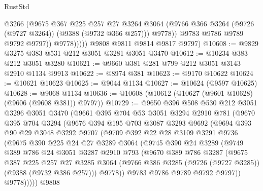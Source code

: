 \begin{lexlean}{RustStd}
\begin{coremodule}
                      @3266
                      (@9675
                        @367
                        @225
                        @257
                        @27
                        @3264
                        @3064
                        (@9766 @366 @3264 (@9726 (@9727 @3264)) (@9388 (@9732 @366 @257)))
                        @9778))
                    @9783
                    @9786
                    @9789
                    @9792
                    @9797))
                @9778)))))
      @9808
      @9811
      @9814
      @9817
      @9797)
@10608 := @9829 @3275 @383 @531 @212 @3051 @3281 @3051 @3470
@10612 := @10234 @383 @212 @3051 @3280
@10621 := @9660 @381 @281 @799 @212 @3051 @3143 @2910 @1134 @9913
@10622 := @8974 @381
@10623 := @9170 @10622
@10624 := @10621 @10623
@10625 := @9044 @1134
@10627 := @10624 (@9597 @10625)
@10628 := @9068 @1134
@10636 := @10608 (@10612 (@10627 (@9601 @10628) (@9606 (@9608 @381)) @9797))
@10729 := @9650
    @396
    @508
    @530
    @212
    @3051
    @3296
    @3051
    @3470
    (@9661
      @395
      @704
      @53
      @3051
      @3294
      @2910
      @781
      (@9670
        @395
        @704
        @3294
        (@9676
          @394
          @195
          @703
          @3087
          @3293
          @9692
          (@9694
            @393
            @90
            @29
            @3048
            @3292
            @9707
            (@9709
              @392
              @22
              @28
              @3109
              @3291
              @9736
              (@9675
                @390
                @225
                @24
                @27
                @3289
                @3064
                (@9745
                  @390
                  @24
                  @3289
                  (@9749
                    @389
                    @786
                    @24
                    @3051
                    @3287
                    @2910
                    @793
                    (@9670
                      @389
                      @786
                      @3287
                      (@9675
                        @387
                        @225
                        @257
                        @27
                        @3285
                        @3064
                        (@9766 @386 @3285 (@9726 (@9727 @3285)) (@9388 (@9732 @386 @257)))
                        @9778))
                    @9783
                    @9786
                    @9789
                    @9792
                    @9797))
                @9778)))))
      @9808

\end{coremodule}
\end{lexlean}
